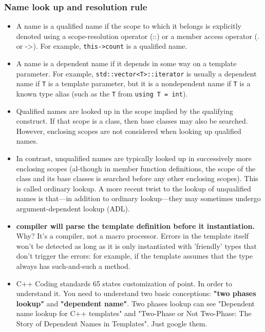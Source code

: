 \documentclass[a4paper,11pt,twoside]{book}
\begin{document}
\subsubsection{Name look up and resolution rule}
\begin{itemize}
    \item A name is a qualified name if the scope to which it belongs is explicitly denoted using a scope-resolution operator (::) or a member access operator (. or ->). For example, \texttt{this->count} is a qualified name.

    \item  A name is a dependent name if it depends in some way on a template parameter.  For example, \texttt{std::vector<T>::iterator} is usually a dependent name if \texttt{T} is a template parameter, but it is a nondependent name if \texttt{T} is a known type alias (such as the \texttt{T} from \texttt{using T = int}).

	\item Qualified names are looked up in the scope implied by the qualifying construct. If that scope is a class, then base classes may also be searched. However, enclosing scopes are not considered when looking up qualified names. 

	\item In contrast, unqualified names are typically looked up in successively more enclosing scopes (al-though in member function definitions, the scope of the class and its base classes is searched before any other enclosing scopes). This is called ordinary lookup. A more recent twist to the lookup of unqualified names is that—in addition to ordinary lookup—they may sometimes undergo argument-dependent lookup (ADL).
            
    \item \textbf{compiler will parse the template definition before it instantiation.} Why? It's a compiler, not a macro processor. Errors in the template itself won't be detected as long as it is only instantiated with 'friendly' types that don't trigger the errors: for example, if the template assumes that the type always has such-and-such a method.

    \item C++ Coding standards 65 states customization of point. In order to understand it. You need to understand two basic conceptions: \textbf{"two phases lookup"} and \textbf{"dependent name"}.  Two phases lookup can see "Dependent name lookup for C++ templates" and "Two-Phase or Not Two-Phase: The Story of Dependent Names in Templates". Just google them.


\end{itemize}
\end{document}

